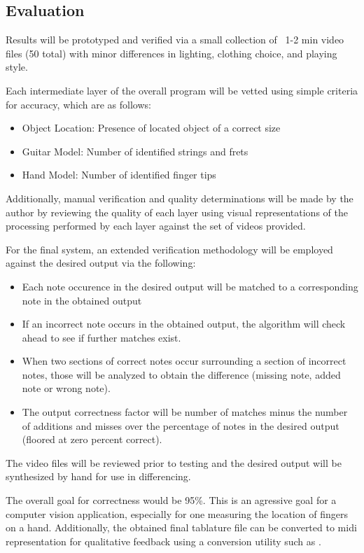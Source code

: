 \subsection{Evaluation}
Results will be prototyped and verified via a small collection of ~1-2 min video files
(50 total) with minor differences in lighting, clothing choice, and playing style.
\par
Each intermediate layer of the overall program will be vetted using simple criteria
for accuracy, which are as follows:
\begin{itemize}
    \item Object Location: Presence of located object of a correct size
    \item Guitar Model: Number of identified strings and frets
    \item Hand Model: Number of identified finger tips
\end{itemize}
Additionally, manual verification and quality determinations will be made by the author by reviewing
the quality of each layer using visual representations of the processing performed by each layer against the
set of videos provided.
\par
For the final system, an extended verification methodology will be employed against the desired output via the following:
\begin{itemize}
    \item Each note occurence in the desired output will be matched to a corresponding note in the obtained output
    \item If an incorrect note occurs in the obtained output, the algorithm will check ahead to see if further
        matches exist.
    \item When two sections of correct notes occur surrounding a section of incorrect notes, those will
        be analyzed to obtain the difference (missing note, added note or wrong note).
    \item The output correctness factor will be number of matches minus the number of additions and misses
        over the percentage of notes in the desired output (floored at zero percent correct).
\end{itemize}
The video files will be reviewed prior to testing and the desired output will be synthesized by hand for use in differencing.
\par
The overall goal for correctness would be 95\%.
This is an agressive goal for a computer vision application,
especially for one measuring the location of fingers on a hand.
Additionally, the obtained final tablature file can be converted to midi representation
for qualitative feedback using a conversion utility such as \cite{8notes}.
